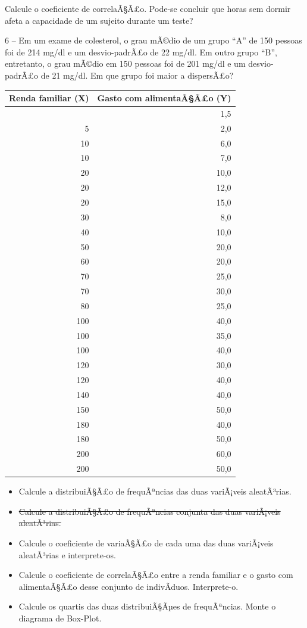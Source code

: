 ﻿\documentclass[11pt]{article}
\providecommand{\tightlist}{%
      \setlength{\itemsep}{0pt}\setlength{\parskip}{0pt}}
\begin{document}
Calcule o coeficiente de correlaÃ§Ã£o. Pode-se concluir que horas sem
dormir afeta a capacidade de um sujeito durante um teste?

    6 -- Em um exame de colesterol, o grau mÃ©dio de um grupo ``A'' de 150
pessoas foi de 214 mg/dl e um desvio-padrÃ£o de 22 mg/dl. Em outro grupo
``B'', entretanto, o grau mÃ©dio em 150 pessoas foi de 201 mg/dl e um
desvio-padrÃ£o de 21 mg/dl. Em que grupo foi maior a dispersÃ£o?

{\def\LTcaptype{table} %
\begin{longtable}[]{@{}rr@{}}
\toprule\noalign{}
Renda familiar (X) & Gasto com alimentaÃ§Ã£o (Y) \\
\midrule\noalign{}
\endhead
\bottomrule\noalign{}
\endlastfoot
3 & 1,5 \\
5 & 2,0 \\
10 & 6,0 \\
10 & 7,0 \\
20 & 10,0 \\
20 & 12,0 \\
20 & 15,0 \\
30 & 8,0 \\
40 & 10,0 \\
50 & 20,0 \\
60 & 20,0 \\
70 & 25,0 \\
70 & 30,0 \\
80 & 25,0 \\
100 & 40,0 \\
100 & 35,0 \\
100 & 40,0 \\
120 & 30,0 \\
120 & 40,0 \\
140 & 40,0 \\
150 & 50,0 \\
180 & 40,0 \\
180 & 50,0 \\
200 & 60,0 \\
200 & 50,0 \\
\end{longtable}
}

    \begin{itemize}
\tightlist
\item
  Calcule a distribuiÃ§Ã£o de frequÃªncias das duas variÃ¡veis aleatÃ³rias.\\
\item
  \st{Calcule a distribuiÃ§Ã£o de frequÃªncias conjunta das duas variÃ¡veis
  aleatÃ³rias.}\\
\item
  Calcule o coeficiente de variaÃ§Ã£o de cada uma das duas variÃ¡veis
  aleatÃ³rias e interprete-os.
\item
  Calcule o coeficiente de correlaÃ§Ã£o entre a renda familiar e o gasto
  com alimentaÃ§Ã£o desse conjunto de indivÃ­duos. Interprete-o.
\item
  Calcule os quartis das duas distribuiÃ§Ãµes de frequÃªncias. Monte o
  diagrama de Box-Plot.
\end{itemize}
\end{document}
